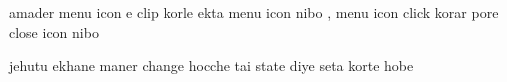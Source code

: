 


amader menu icon e clip korle ekta menu icon nibo , menu icon click korar pore close icon nibo 

jehutu ekhane maner change hocche tai state diye seta korte hobe 


